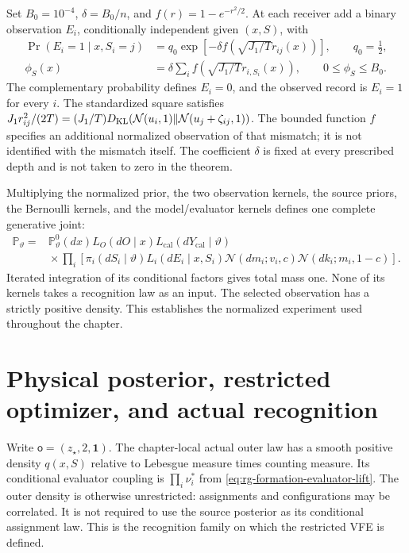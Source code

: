 Set \(B_0=10^{-4}\), \(\delta=B_0/n\), and
\(f(r)=1-e^{-r^2/2}\). At each receiver add a binary observation
\(E_i\), conditionally independent given \((x,S)\), with
\begin{equation}
\begin{aligned}
\Pr(E_i=1\mid x,S_i=j)
  &=q_0\exp\left[-\delta
       f\left(\sqrt{J_1/T}r_{ij}(x)\right)\right],
       \qquad q_0=\tfrac12,\\
\phi_S(x)&=\delta\sum_i
       f\left(\sqrt{J_1/T}r_{i,S_i}(x)\right),
       \qquad 0\le\phi_S\le B_0.
\end{aligned}
\label{eq:rg-formation-source-record}
\end{equation}
The complementary probability defines \(E_i=0\), and the observed
record is \(E_i=1\) for every \(i\). The standardized square satisfies
\(J_1r_{ij}^2/(2T)=(J_1/T)
D_{\mathrm{KL}}(\mathcal N(u_i,1)\Vert\mathcal N(u_j+\zeta_{ij},1))\).
The bounded function \(f\) specifies an additional normalized
observation of that mismatch; it is not identified with the mismatch
itself. The coefficient \(\delta\) is fixed at every prescribed depth
and is not taken to zero in the theorem. 

Multiplying the normalized prior, the two observation kernels, the
source priors, the Bernoulli kernels, and the model/evaluator kernels
defines one complete generative joint:
\begin{equation}
\begin{aligned}
\mathbb P_\vartheta
={}&\mathbb P^0_\vartheta(dx)
 L_O(dO\mid x)L_{\mathrm{cal}}(dY_{\mathrm{cal}}\mid\vartheta)\\
&{}\times\prod_i\left[
 \pi_i(dS_i\mid\vartheta)L_i(dE_i\mid x,S_i)
 \mathcal N(dm_i;v_i,c)
 \mathcal N(dk_i;m_i,1-c)\right].
\end{aligned}
\label{eq:rg-formation-full-joint}
\end{equation}
Iterated integration of its conditional factors gives total mass one.
None of its kernels takes a recognition law as an input. The selected
observation has a strictly positive density. This establishes the
normalized experiment used throughout the chapter.

\section{Physical posterior, restricted optimizer, and actual recognition}
\label{sec:rg-formation-laws}

Write \(\mathsf o=(z_\star,2,\mathbf1)\). The chapter-local actual
outer law has a smooth positive density \(q(x,S)\) relative to
Lebesgue measure times counting measure. Its conditional evaluator
coupling is \(\prod_i\nu_i^*\) from
\cref{eq:rg-formation-evaluator-lift}. The outer density is otherwise
unrestricted: assignments and configurations may be correlated. It is
not required to use the source posterior as its conditional assignment
law. This is the recognition family on which the restricted VFE is
defined. 

